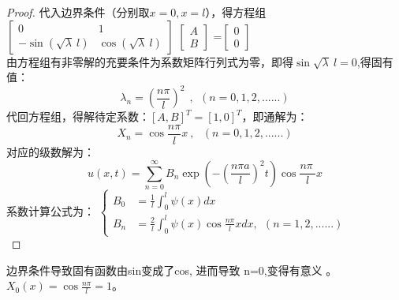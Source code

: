 \begin{example}
\begin{proof}
代入边界条件（分别取$x=0, x=l$），得方程组 \\
$\left[
\begin{array}{lll}
	0&1\\
	-\sin( {\sqrt{\lambda}~l}) &\cos ({\sqrt{\lambda}~l})
\end{array}
\right]$
$\left[
\begin{array}{ll}
	A\\
	B
\end{array}
\right]$
=$\left[
\begin{array}{ll}
	0\\
	0
\end{array}
\right]$\\ 
由方程组有非零解的充要条件为系数矩阵行列式为零，即得$ \sin\sqrt{\lambda}~l =0$,得固有值：
\begin{equation*}
	\lambda_n =(\frac{n\pi}{l})^2 ~~,~~ (n=0,1,2,......)
\end{equation*}
代回方程组，得解待定系数：$ [A, B] ^T =[1, 0] ^T$，即通解为：
\begin{equation*}
	X_n=\cos \frac{n\pi}{l} x~,~~~  (n=0,1,2,......)
\end{equation*}
对应的级数解为：
\begin{equation*}
	u(x,t)=\sum_{n=0}^{\infty } B_n  \exp(-(\frac{n\pi a}{l})^2 t) \cos \frac{n\pi~}{l} x
\end{equation*}
系数计算公式为：
$\displaystyle  \begin{cases}
 B_0&= \frac{1}{l} \int_{0}^{l} \psi(x) dx \\
 B_n&= \frac{2}{l} \int_{0}^{l} \psi(x) \cos \frac{n\pi}{l} xdx ,~~ (n=1,2,......)
\end{cases}$ \\	
\end{proof}
\end{example}

\begin{remark}
	边界条件导致固有函数由sin变成了cos, 进而导致 n=0,变得有意义 。$X_0(x) = \cos \frac{n\pi}{l} =1$。
\end{remark}

